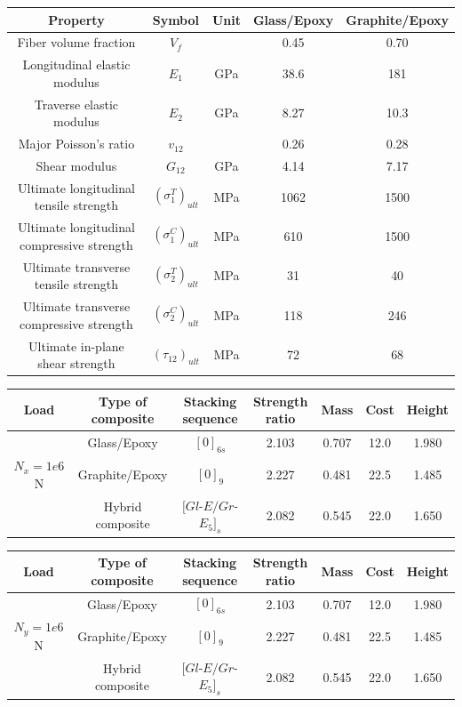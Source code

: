 \documentclass[smallextended]{svjour3}       %
\begin{document}
\begin{tabular}{ccccc}
	\toprule
	Property								  & Symbol	   & Unit &  Glass/Epoxy &  Graphite/Epoxy  \\
	\midrule
	Fiber volume fraction					  & $V_f$		      &      &  0.45        &  0.70   \\
	Longitudinal elastic modulus			  & $E_1$		      & GPa  &  38.6        &  181  \\
	Traverse elastic modulus				  & $E_2$		      & GPa  &  8.27        &  10.3  \\
	Major Poisson's ratio					  & $v_{12}$	      &      &  0.26        &  0.28  \\
	Shear modulus							  & $G_{12}$	      & GPa  &  4.14        &  7.17  \\
	Ultimate longitudinal tensile strength    &  $(\sigma_1^T)_{ult}$ & MPa  &  1062        &  1500  \\
	Ultimate longitudinal compressive strength & $(\sigma_1^C)_{ult}$ & MPa  &  610        &  1500  \\
	Ultimate transverse tensile strength    &  $(\sigma_2^T)_{ult}$ & MPa  &  31        &  40 \\
	Ultimate transverse compressive strength & $(\sigma_2^C)_{ult}$ & MPa  &  118        &  246\\
	Ultimate in-plane shear strength          & $(\tau_{12})_{ult}$ & MPa  &  72&  68\\
	\bottomrule
\end{tabular}



\begin{tabular}{ccccccc}
	\toprule
	Load         &Type of composite & Stacking sequence    & Strength ratio  & Mass &  Cost   & Height\\
	\midrule
	           &Glass/Epoxy       & $[0]_{6s}$           & 2.103           & 0.707 &  12.0  & 1.980  \\
	$N_x=1e6$ N &Graphite/Epoxy    &  $[0]_9$             & 2.227           & 0.481 &  22.5  & 1.485 \\
	            &Hybrid composite  &  $[Gl${\text -}$E/Gr${\text -}$E_{5}]_s$ & 2.082  & 0.545 &  22.0  & 1.650 \\
	\bottomrule
\end{tabular}


\begin{tabular}{ccccccc}
	\toprule
	Load         &Type of composite & Stacking sequence    & Strength ratio  & Mass &  Cost   & Height\\
	\midrule
	           &Glass/Epoxy       & $[0]_{6s}$           & 2.103           & 0.707 &  12.0  & 1.980  \\
	$N_y=1e6$ N  &Graphite/Epoxy    &  $[0]_9$             & 2.227           & 0.481 &  22.5  & 1.485 \\
	            &Hybrid composite  &  $[Gl${\text -}$E/Gr${\text -}$E_{5}]_s$ & 2.082  & 0.545 &  22.0  & 1.650 \\
	\bottomrule
\end{tabular}
\end{document}
